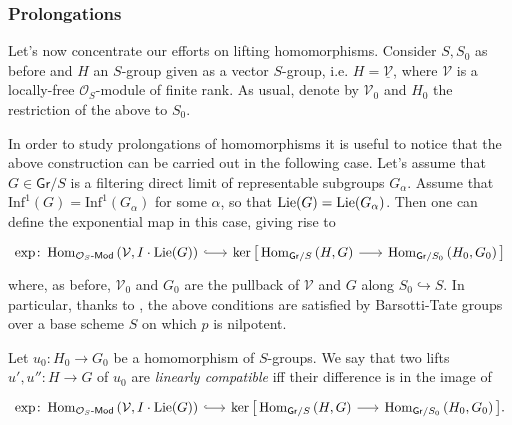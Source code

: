 \subsubsection{Prolongations}
Let's now concentrate our efforts on lifting homomorphisms.
Consider $S, S_0$ as before and
$H$ an $S$-group given as a vector \(S\)-group,
i.e. $H = \underline{\mathcal{V}}$, where $\mathcal{V}$ is a locally-free $\mathcal{O}_{ S }$-module
of finite rank.
As usual, denote by $\mathcal{V}_0$ and $H_0$ the restriction of the above to $S_0$.


\begin{rem}
	In order to study prolongations of homomorphisms it is useful to notice that
	the above construction can be carried out in the following case.
	Let's assume that $G \in \mathsf{Gr}/S$ is a filtering direct limit of
	representable subgroups $G_\alpha$.
	Assume that $\mathrm{Inf}^1(G) = \mathrm{Inf}^1(G_\alpha)$ for some $\alpha$,
	so that $\operatorname{Lie}(G) = \operatorname{Lie}(G_\alpha)$.
	Then one can define the exponential map in this case, giving rise to
	\begin{equation*}
	\begin{tikzcd}[row sep = 0ex, column sep = 1.72em
		,/tikz/column 1/.append style={anchor=base east}
		,/tikz/column 2/.append style={anchor=base west}]
		\exp\colon
		\Hom_{ \mathcal{O}_{ S }\text{-}\mathsf{Mod} }
		\left( \mathcal{V}, I \cdot \lie(G) \right)
		\arrow[r, "", hookrightarrow] &
		\ker \big[ 
		\Hom_{ \mathsf{Gr}/S } 
		\left( H, G \right)
		\arrow[r, "", rightarrow] &
		\Hom_{ \mathsf{Gr}/S_0 }
		\left( H_0, G_0 \right)
		\big]
	\end{tikzcd}
	\end{equation*} 
	where, as before, $\mathcal{V}_0$ and $G_0$ are the pullback of 
	$\mathcal{V}$ and $G$ along $S_0 \hookrightarrow S$.
	In particular, thanks to \cite[Chapter II, Corollary 3.3.16]{Messing},
	the above conditions are satisfied by Barsotti-Tate
	groups over a base scheme $S$ on which $p$ is nilpotent.
\end{rem}


\begin{defn}\label{defn:LinCompProlong}
	Let $u_0\colon H_0 \to G_0$ be a homomorphism of $S$-groups.
	We say that two lifts $u', u''\colon H \to G$ of $u_0$
	are \emph{linearly compatible} iff their difference is in the image
	of 
	\begin{equation*}
	\begin{tikzcd}[row sep = 0ex, column sep = 1.59em
		,/tikz/column 1/.append style={anchor=base east}
		,/tikz/column 2/.append style={anchor=base west}]
		\exp\colon
		\Hom_{ \mathcal{O}_{ S }\text{-}\mathsf{Mod} }
		\left( \mathcal{V}, I \cdot \lie(G) \right)
		\arrow[r, "", hookrightarrow] &
		\ker \big[ 
		\Hom_{ \mathsf{Gr}/S } 
		\left( H, G \right)
		\arrow[r, "", rightarrow] &
		\Hom_{ \mathsf{Gr}/S_0 }
		\left( H_0, G_0 \right)
		\big]
	.\end{tikzcd}
	\end{equation*} 
\end{defn}


